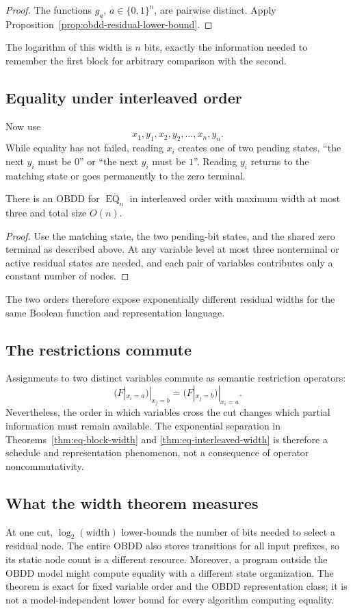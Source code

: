 \begin{proof}
The functions $g_a$, $a\in\{0,1\}^n$, are pairwise distinct.  Apply
Proposition~\ref{prop:obdd-residual-lower-bound}.
\end{proof}

The logarithm of this width is $n$ bits, exactly the information needed to
remember the first block for arbitrary comparison with the second.

\subsection{Equality under interleaved order}

Now use
\[
  x_1,y_1,x_2,y_2,\ldots,x_n,y_n.
\]
While equality has not failed, reading $x_i$ creates one of two pending states,
``the next $y_i$ must be $0$'' or ``the next $y_i$ must be $1$''.  Reading
$y_i$ returns to the matching state or goes permanently to the zero terminal.

\begin{theorem}
\label{thm:eq-interleaved-width}
There is an OBDD for $\operatorname{EQ}_n$ in interleaved order with maximum
width at most three and total size $O(n)$.
\end{theorem}

\begin{proof}
Use the matching state, the two pending-bit states, and the shared zero
terminal as described above.  At any variable level at most three nonterminal
or active residual states are needed, and each pair of variables contributes
only a constant number of nodes.
\end{proof}

The two orders therefore expose exponentially different residual widths for
the same Boolean function and representation language.

\subsection{The restrictions commute}

Assignments to two distinct variables commute as semantic restriction
operators:
\[
  (F|_{x_i=a})|_{x_j=b}
  =(F|_{x_j=b})|_{x_i=a}.
\]
Nevertheless, the order in which variables cross the cut changes which partial
information must remain available.  The exponential separation in
Theorems~\ref{thm:eq-block-width} and
\ref{thm:eq-interleaved-width} is therefore a schedule and representation
phenomenon, not a consequence of operator noncommutativity.

\subsection{What the width theorem measures}

At one cut, $\log_2(\text{width})$ lower-bounds the number of bits needed to
select a residual node.  The entire OBDD also stores transitions for all input
prefixes, so its static node count is a different resource.  Moreover, a
program outside the OBDD model might compute equality with a different state
organization.  The theorem is exact for fixed variable order and the OBDD
representation class; it is not a model-independent lower bound for every
algorithm computing equality.
